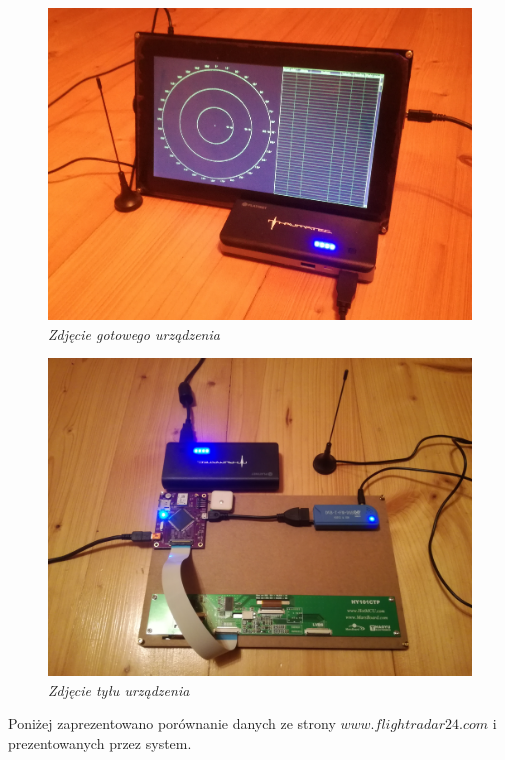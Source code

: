 \documentclass[eng,printmode]{mgr}
\begin{document}
\vskip 1cm
\begin{figure}[!h]
    \centering
    \includegraphics[width=\textwidth]{images/deviceTop2}
    \caption{\textit{Zdjęcie gotowego urządzenia}}
\end{figure}
\newpage
\begin{figure}[!h]
    \centering
    \includegraphics[width=\textwidth]{images/deviceBottom}
    \caption{\textit{Zdjęcie tyłu urządzenia}}
\end{figure}

Poniżej zaprezentowano porównanie danych ze strony $www.flightradar24.com$ i prezentowanych przez system.
\end{document}
